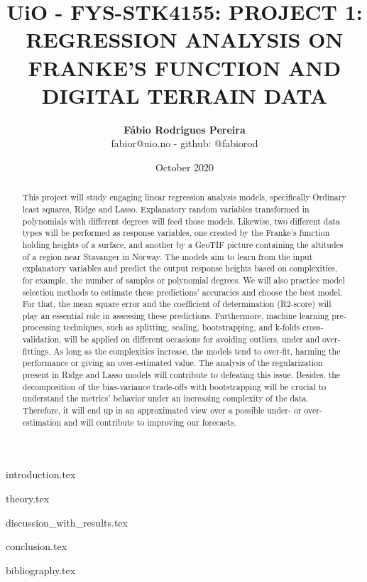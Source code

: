 \documentclass{article}
\title{UiO - FYS-STK4155: PROJECT 1: REGRESSION ANALYSIS ON FRANKE'S  FUNCTION AND DIGITAL TERRAIN DATA}
\author{\textbf{Fábio Rodrigues Pereira} \\ \small fabior@uio.no - github: @fabiorod}
\date{October 2020}
\begin{document}
\maketitle
\begin{abstract}
\noindent This project will study engaging linear regression analysis models, specifically Ordinary least squares, Ridge and Lasso. Explanatory random variables transformed in polynomials with different degrees will feed those models. Likewise, two different data types will be performed as response variables, one created by the Franke's function holding heights of a surface, and another by a GeoTIF picture containing the altitudes of a region near Stavanger in Norway. The models aim to learn from the input explanatory variables and predict the output response heights based on complexities, for example, the number of samples or polynomial degrees. We will also practice model selection methods to estimate these predictions' accuracies and choose the best model. For that, the mean square error and the coefficient of determination (R2-score) will play an essential role in assessing these predictions. Furthermore, machine learning pre-processing techniques, such as splitting, scaling, bootstrapping, and k-folds cross-validation, will be applied on different occasions for avoiding outliers, under and over-fittings. As long as the complexities increase, the models tend to over-fit, harming the performance or giving an over-estimated value. The analysis of the regularization present in Ridge and Lasso models will contribute to defeating this issue. Besides, the decomposition of the bias-variance trade-offs with bootstrapping will be crucial to understand the metrics' behavior under an increasing complexity of the data. Therefore, it will end up in an approximated view over a possible under- or over-estimation and will contribute to improving our forecasts.
\end{abstract}

\clearpage
\thispagestyle{empty}

\tableofcontents

\clearpage
\thispagestyle{empty}

{introduction.tex}

{theory.tex}

{discussion_with_results.tex}

{conclusion.tex}

{bibliography.tex}
\end{document}
